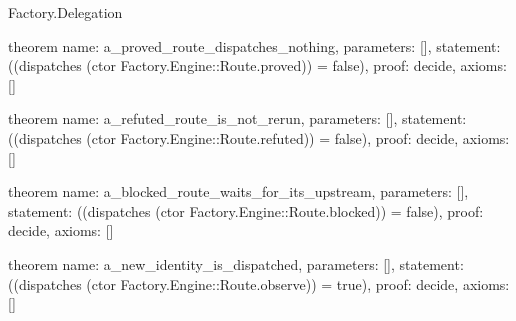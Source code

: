 \begin{lexlean}{Factory.Delegation}
\begin{semanticmodule}
theorem{
  name: a_proved_route_dispatches_nothing,
  parameters: [],
  statement: ((dispatches (ctor Factory.Engine::Route.proved)) = false),
  proof: decide{},
  axioms: []
}

theorem{
  name: a_refuted_route_is_not_rerun,
  parameters: [],
  statement: ((dispatches (ctor Factory.Engine::Route.refuted)) = false),
  proof: decide{},
  axioms: []
}

theorem{
  name: a_blocked_route_waits_for_its_upstream,
  parameters: [],
  statement: ((dispatches (ctor Factory.Engine::Route.blocked)) = false),
  proof: decide{},
  axioms: []
}

theorem{
  name: a_new_identity_is_dispatched,
  parameters: [],
  statement: ((dispatches (ctor Factory.Engine::Route.observe)) = true),
  proof: decide{},
  axioms: []
}
\end{semanticmodule}
\end{lexlean}
